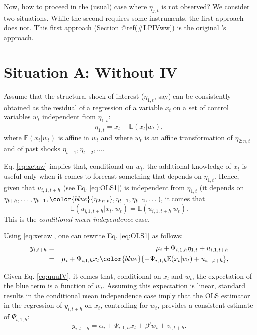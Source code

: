 \documentclass[
  12pt,
]{book}
\theoremstyle{definition}
\theoremstyle{definition}
\theoremstyle{definition}
\theoremstyle{definition}
\theoremstyle{remark}
\begin{document}
Now, how to proceed in the (usual) case where \(\eta_{j,t}\) is not observed? We consider two situations. While the second requires some instruments, the first approach does not. This first approach (Section @ref(\#LPIVww)) is the original \citet{Jorda_2005}'s approach.

\hypertarget{LPIVww}{%
\section{Situation A: Without IV}\label{LPIVww}}

Assume that the structural shock of interest (\(\eta_{1,t}\), say) can be consistently obtained as the residual of a regression of a variable \(x_t\) on a set of control variables \(w_t\) independent from \(\eta_{1,t}\):
\begin{equation}
\eta_{1,t} = x_t - \mathbb{E}(x_t|w_t),\label{eq:xetaw}
\end{equation}
where \(\mathbb{E}(x_t|w_t)\) is affine in \(w_t\) and where \(w_t\) is an affine transformation of \(\eta_{2:n,t}\) and of past shocks \(\eta_{t-1},\eta_{t-2},\dots\).

Eq. \eqref{eq:xetaw} implies that, conditional on \(w_t\), the additional knowledge of \(x_t\) is useful only when it comes to forecast something that depends on \(\eta_{1,t}\). Hence, given that \(u_{i,1,t+h}\) (see Eq. \eqref{eq:OLS1}) is independent from \(\eta_{1,t}\) (it depends on \(\eta_{t+h},\dots,\eta_{t+1},\color{blue}{\eta_{2:n,t}},\eta_{t-1},\eta_{t-2},\dots\)), it comes that
\begin{equation}
\mathbb{E}(u_{i,1,t+h}|x_t,w_t)= \mathbb{E}(u_{i,1,t+h}|w_t).\label{eq:uuuIV}
\end{equation}
This is the \emph{conditional mean independence} case.

Using \eqref{eq:xetaw}, one can rewrite Eq. \eqref{eq:OLS1} as follows:
\begin{eqnarray*}
y_{i,t+h} &=& \mu_i + \Psi_{i,1,h}\eta_{1,t} + u_{i,1,t+h}\\
&=&  \mu_i + \Psi_{i,1,h}x_t  \color{blue}{-\Psi_{i,1,h}\mathbb{E}(x_t|w_t) + u_{i,1,t+h}},
\end{eqnarray*}

Given Eq. \eqref{eq:uuuIV}, it comes that, conditional on \(x_t\) and \(w_t\), the expectation of the blue term is a function of \(w_t\). Assuming this expectation is linear, standard results in the conditional mean independence case imply that the OLS estimator in the regression of \(y_{i,t+h}\) on \(x_t\), controlling for \(w_t\), provides a consistent estimate of \(\Psi_{i,1,h}\):
\begin{equation}
y_{i,t+h} = \alpha_i + \Psi_{i,1,h}x_t + \beta'w_t + v_{i,t+h}.
\end{equation}
\end{document}
